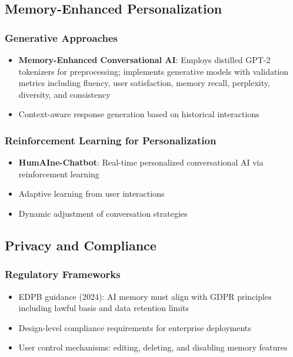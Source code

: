 \documentclass[11pt,letterpaper]{article}
\begin{document}
\subsection{Memory-Enhanced Personalization}

\subsubsection{Generative Approaches}
\begin{itemize}[leftmargin=*]
    \item \textbf{Memory-Enhanced Conversational AI}: Employs distilled GPT-2 tokenizers for preprocessing; implements generative models with validation metrics including fluency, user satisfaction, memory recall, perplexity, diversity, and consistency
    \item Context-aware response generation based on historical interactions
\end{itemize}

\subsubsection{Reinforcement Learning for Personalization}
\begin{itemize}[leftmargin=*]
    \item \textbf{HumAIne-Chatbot}: Real-time personalized conversational AI via reinforcement learning
    \item Adaptive learning from user interactions
    \item Dynamic adjustment of conversation strategies
\end{itemize}

\subsection{Privacy and Compliance}

\subsubsection{Regulatory Frameworks}
\begin{itemize}[leftmargin=*]
    \item EDPB guidance (2024): AI memory must align with GDPR principles including lawful basis and data retention limits
    \item Design-level compliance requirements for enterprise deployments
    \item User control mechanisms: editing, deleting, and disabling memory features
\end{itemize}
\end{document}
